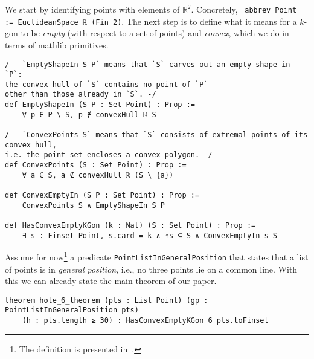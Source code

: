 We start by identifying points with elements of $\mathbb{R}^2$. Concretely, ~\lstinline|abbrev Point := EuclideanSpace ℝ (Fin 2)|.
The next step is to define what it means for a $k$-gon to be \emph{empty} (with respect to a set of points) and \emph{convex}, which we do in terms of \textsf{mathlib} primitives.

\begin{lstlisting}
/-- `EmptyShapeIn S P` means that `S` carves out an empty shape in `P`:
the convex hull of `S` contains no point of `P`
other than those already in `S`. -/
def EmptyShapeIn (S P : Set Point) : Prop :=
    ∀ p ∈ P \ S, p ∉ convexHull ℝ S

/-- `ConvexPoints S` means that `S` consists of extremal points of its convex hull,
i.e. the point set encloses a convex polygon. -/
def ConvexPoints (S : Set Point) : Prop :=
    ∀ a ∈ S, a ∉ convexHull ℝ (S \ {a})

def ConvexEmptyIn (S P : Set Point) : Prop :=
    ConvexPoints S ∧ EmptyShapeIn S P

def HasConvexEmptyKGon (k : Nat) (S : Set Point) : Prop :=
    ∃ s : Finset Point, s.card = k ∧ ↑s ⊆ S ∧ ConvexEmptyIn s S
\end{lstlisting}

Assume for now\footnote{The definition is presented in~.} a predicate \lstinline|PointListInGeneralPosition| that states that a list of points is in \emph{general position}, i.e., no three points lie on a common line.
With this we can already state the main theorem of our paper.

\begin{lstlisting}
theorem hole_6_theorem (pts : List Point) (gp : PointListInGeneralPosition pts)
    (h : pts.length ≥ 30) : HasConvexEmptyKGon 6 pts.toFinset 
\end{lstlisting}

